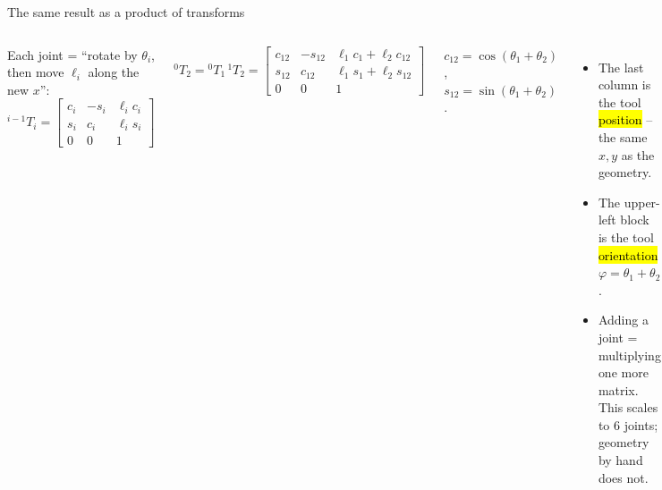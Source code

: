 \documentclass[aspectratio=169,10pt]{beamer}
\begin{document}
\begin{frame}[t]{The same result as a product of transforms}
\begin{columns}[T,onlytextwidth]
\small Each joint = ``rotate by $\theta_i$, then move $\ell_i$ along the new $x$'':
\[
{}^{i-1}T_i=\begin{bmatrix}c_i&-s_i&\ell_ic_i\\ s_i&c_i&\ell_is_i\\0&0&1\end{bmatrix}
\]
\begin{eqbox}
\vspace{-2mm}
\[
{}^0T_2={}^0T_1\,{}^1T_2=\begin{bmatrix}c_{12}&-s_{12}&\ell_1c_1+\ell_2c_{12}\\ s_{12}&c_{12}&\ell_1s_1+\ell_2s_{12}\\0&0&1\end{bmatrix}
\]
\vspace{-4mm}
\end{eqbox}
{\scriptsize $c_{12}=\cos(\theta_1+\theta_2)$, $s_{12}=\sin(\theta_1+\theta_2)$.}
\begin{itemize}\small
\item The last column is the tool \hl{position} -- the same $x,y$ as the geometry.
\item The upper-left block is the tool \hl{orientation} $\varphi=\theta_1+\theta_2$.
\item Adding a joint = multiplying one more matrix. This scales to 6 joints; geometry by hand does not.
\end{itemize}
\end{columns}
\end{frame}
\end{document}
